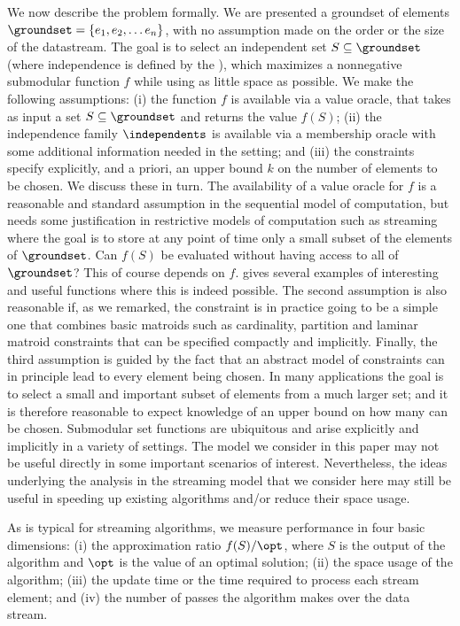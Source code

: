 \documentclass[oneside,letterpaper]{scrartcl} \usepackage{macros}
\begin{document}
We now describe the problem formally. We are presented a groundset of
elements $\groundset = \{ e_1, e_2, \ldots e_n \}$, with no assumption
made on the order or the size of the datastream. The goal is to select
an independent set $S \subseteq \groundset$ (where independence is
defined by the ), which maximizes
a nonnegative submodular function $f$ while using as little space as
possible. We make the following assumptions: (i) the function $f$ is
available via a value oracle, that takes as input a set $S \subseteq
\groundset$ and returns the value $f(S)$; (ii) the independence family
$\independents$ is available via a membership oracle with some
additional information needed in the  setting;
and (iii) the constraints specify explicitly, and a priori, an upper
bound $k$ on the number of elements to be chosen. We discuss these in
turn.  The availability of a value oracle for $f$ is a reasonable and
standard assumption in the sequential model of computation, but needs
some justification in restrictive models of computation such as
streaming where the goal is to store at any point of time only a small
subset of the elements of $\groundset$. Can $f(S)$ be evaluated
without having access to all of $\groundset$? This of course depends
on $f$. \cite{bmkk-sso-14} gives several examples of interesting and
useful functions where this is indeed possible. The second assumption
is also reasonable if, as we remarked, the 
constraint is in practice going to be a simple one that combines basic
matroids such as cardinality, partition and laminar matroid
constraints that can be specified compactly and implicitly. Finally,
the third assumption is guided by the fact that an abstract model of
constraints can in principle lead to every element being chosen. In
many applications the goal is to select a small and important subset
of elements from a much larger set; and it is therefore reasonable to
expect knowledge of an upper bound on how many can be chosen.
Submodular set functions are ubiquitous and arise explicitly and
implicitly in a variety of settings. The model we consider in this
paper may not be useful directly in some important scenarios of
interest. Nevertheless, the ideas underlying the analysis in the
streaming model that we consider here may still be useful in speeding
up existing algorithms and/or reduce their space usage.


As is typical for streaming algorithms, we measure performance in four
basic dimensions: (i) the approximation ratio $f(S)/\opt$, where $S$
is the output of the algorithm and $\opt$ is the value of an optimal
solution; (ii) the space usage of the algorithm; (iii) the update time
or the time required to process each stream element; and (iv) the
number of passes the algorithm makes over the data stream.
\end{document}
